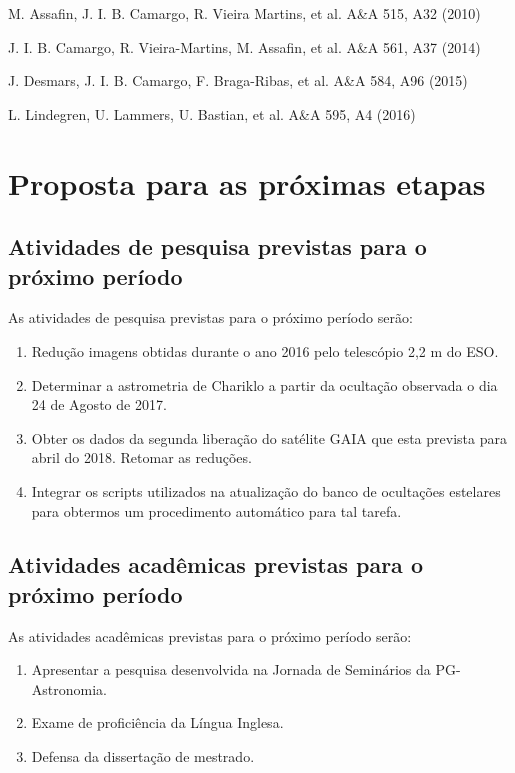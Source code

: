 \documentclass[a4paper, 11pt]{article}
\begin{document}
\noindent M. Assafin, J. I. B. Camargo, R. Vieira Martins, et al. A\&A 515, A32 (2010)

\noindent J. I. B. Camargo, R. Vieira-Martins, M. Assafin, et al. A\&A 561, A37 (2014)

\noindent J. Desmars, J. I. B. Camargo, F. Braga-Ribas, et al. A\&A 584, A96 (2015) 

\noindent L. Lindegren, U. Lammers, U. Bastian, et al. A\&A 595, A4 (2016)
\vspace{-0.3 cm}
\section{Proposta para as próximas etapas}

\subsection{Atividades de pesquisa previstas para o próximo período}
As atividades de pesquisa previstas para o pr\'oximo per\'iodo ser\~ao:

\begin{enumerate}
\item Redução imagens obtidas durante o ano 2016 pelo telescópio 2,2 m do ESO.
\item Determinar a astrometria de Chariklo a partir da ocultação observada o dia 24 de Agosto de 2017. 
\item Obter os dados da segunda liberação do satélite GAIA que esta prevista para abril do 2018. Retomar as redu\c c\~oes.
\item Integrar os scripts utilizados na atualiza\c c\~ao do banco de oculta\c c\~oes estelares para obtermos um procedimento autom\'atico para tal tarefa.
\end{enumerate}
\subsection{Atividades acadêmicas previstas para o próximo período}

As atividades acadêmicas previstas para o pr\'oximo per\'iodo ser\~ao:

\begin{enumerate}[resume]
  \item Apresentar a pesquisa desenvolvida na Jornada de Seminários da PG-Astronomia.
  \item Exame de proficiência da L\'ingua Inglesa.
  \item Defensa da dissertação de mestrado.  
\end{enumerate}
\end{document}
